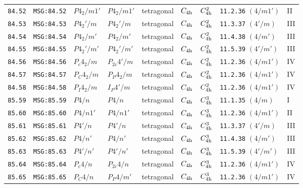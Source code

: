 \documentclass[fleqn,10pt]{jsarticle}
\begin{document}
\begin{center}
\begin{longtable}{lllllllll}
\texttt{84.52} & \texttt{MSG:84.52} & $P4_{2}/m1'$ & $P4_{2}/m1'$ & tetragonal & $C_{\rm 4h}$ & $C_{\rm 4h}^{2}$ & \texttt{11.2.36} $(4/m1')$ & II \\
\texttt{84.53} & \texttt{MSG:84.53} & $P4_{2}'/m$ & $P4_{2}'/m$ & tetragonal & $C_{\rm 4h}$ & $C_{\rm 4h}^{2}$ & \texttt{11.3.37} $(4'/m)$ & III \\
\texttt{84.54} & \texttt{MSG:84.54} & $P4_{2}/m'$ & $P4_{2}/m'$ & tetragonal & $C_{\rm 4h}$ & $C_{\rm 4h}^{2}$ & \texttt{11.4.38} $(4/m')$ & III \\
\texttt{84.55} & \texttt{MSG:84.55} & $P4_{2}'/m'$ & $P4_{2}'/m'$ & tetragonal & $C_{\rm 4h}$ & $C_{\rm 4h}^{2}$ & \texttt{11.5.39} $(4'/m')$ & III \\
\texttt{84.56} & \texttt{MSG:84.56} & $P_{c}4_{2}/m$ & $P_{2c}4'/m$ & tetragonal & $C_{\rm 4h}$ & $C_{\rm 4h}^{2}$ & \texttt{11.2.36} $(4/m1')$ & IV \\
\texttt{84.57} & \texttt{MSG:84.57} & $P_{C}4_{2}/m$ & $P_{P}4_{2}/m$ & tetragonal & $C_{\rm 4h}$ & $C_{\rm 4h}^{2}$ & \texttt{11.2.36} $(4/m1')$ & IV \\
\texttt{84.58} & \texttt{MSG:84.58} & $P_{I}4_{2}/m$ & $I_{P}4'/m$ & tetragonal & $C_{\rm 4h}$ & $C_{\rm 4h}^{2}$ & \texttt{11.2.36} $(4/m1')$ & IV \\ \hline
\texttt{85.59} & \texttt{MSG:85.59} & $P4/n$ & $P4/n$ & tetragonal & $C_{\rm 4h}$ & $C_{\rm 4h}^{3}$ & \texttt{11.1.35} $(4/m)$ & I \\
\texttt{85.60} & \texttt{MSG:85.60} & $P4/n1'$ & $P4/n1'$ & tetragonal & $C_{\rm 4h}$ & $C_{\rm 4h}^{3}$ & \texttt{11.2.36} $(4/m1')$ & II \\
\texttt{85.61} & \texttt{MSG:85.61} & $P4'/n$ & $P4'/n$ & tetragonal & $C_{\rm 4h}$ & $C_{\rm 4h}^{3}$ & \texttt{11.3.37} $(4'/m)$ & III \\
\texttt{85.62} & \texttt{MSG:85.62} & $P4/n'$ & $P4/n'$ & tetragonal & $C_{\rm 4h}$ & $C_{\rm 4h}^{3}$ & \texttt{11.4.38} $(4/m')$ & III \\
\texttt{85.63} & \texttt{MSG:85.63} & $P4'/n'$ & $P4'/n'$ & tetragonal & $C_{\rm 4h}$ & $C_{\rm 4h}^{3}$ & \texttt{11.5.39} $(4'/m')$ & III \\
\texttt{85.64} & \texttt{MSG:85.64} & $P_{c}4/n$ & $P_{2c}4/n$ & tetragonal & $C_{\rm 4h}$ & $C_{\rm 4h}^{3}$ & \texttt{11.2.36} $(4/m1')$ & IV \\
\texttt{85.65} & \texttt{MSG:85.65} & $P_{C}4/n$ & $P_{P}4/m'$ & tetragonal & $C_{\rm 4h}$ & $C_{\rm 4h}^{3}$ & \texttt{11.2.36} $(4/m1')$ & IV \\

\end{longtable}
\end{center}
\end{document}
